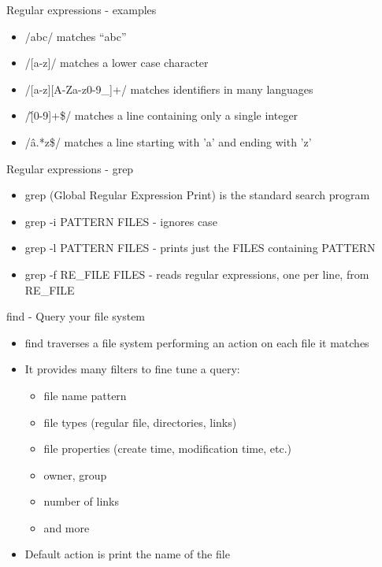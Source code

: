 \documentclass[t]{beamer}
\begin{document}
\begin{frame}{Regular expressions - examples}
  \begin{itemize}
  \item /abc/  matches ``abc''
  \item /[a-z]/ matches a lower case character
  \item /[a-z][A-Za-z0-9\_]+/ matches identifiers in many languages
  \item /\^[0-9]+\$/ matches a line containing only a single integer
  \item /\^a.*z\$/ matches a line starting with 'a' and ending with 'z'
  \end{itemize}
  \note{}
\end{frame}

\begin{frame}{Regular expressions - grep}
  \begin{itemize}
  \item grep (Global Regular Expression Print) is the standard search
    program
  \item grep -i PATTERN FILES - ignores case
  \item grep -l PATTERN FILES - prints just the FILES containing
    PATTERN
  \item grep -f RE\_FILE FILES - reads regular expressions, one per
    line, from RE\_FILE
  \end{itemize}
  \note{}
\end{frame}

\begin{frame}{find - Query your file system}
  \begin{itemize}
  \item find traverses a file system performing an action on each file it matches
  \item It provides many filters to fine tune a query:
    \begin{itemize}
    \item file name pattern
    \item file types (regular file, directories, links)
    \item file properties (create time, modification time, etc.)
    \item owner, group
    \item number of links
    \item and more
    \end{itemize}
  \item Default action is print the name of the file
  \end{itemize}
  \note{}
\end{frame}
\end{document}
